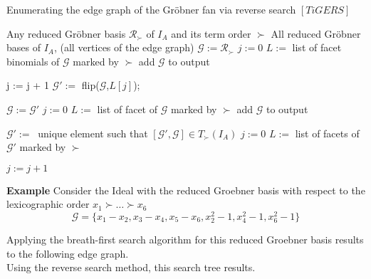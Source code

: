 \begin{algorithm}
\caption{Enumerating the edge graph of the Gröbner fan via reverse search $\left[ TiGERS\right]  $}
\label{reverse-alg}
\begin{algorithmic}[1]

\Require
Any reduced Gröbner basis $ \mathcal{R}_{\succ} $ of $I_A$ and its term order $\succ$
\Ensure All reduced Gröbner bases of $I_A$, (all vertices of the edge graph)
\State $\mathcal{G} := \mathcal{R}_{\succ} $
\State $j := 0$
\State $L := $ list of facet binomials of $\mathcal{G}$ marked by $\succ$
\State add $\mathcal{G}$ to output
\Repeat
{}

\State j := j + 1
\State $\mathcal{G}':= $ flip($\mathcal{G}$,$L[j]$);

\State $\mathcal{G} := \mathcal{G}' $  
\State $ j := 0$
\State $ L := $ list of facet of $\mathcal{G}$ marked by $\succ$
\State add $ \mathcal{G}$ to output

\EndIf 

\EndWhile

\State $\mathcal{G}' :=~$ unique element such that $[\mathcal{G}',\mathcal{G}] \in T_{\succ}(I_{A}) $
\State $j := 0$
\State $L := $ list of facets of $\mathcal{G}'$ marked by $\succ$

\Repeat
\State $j := j + 1$

\EndIf



\end{algorithmic}
\end{algorithm}

\textbf{Example}
Consider the Ideal with the reduced Groebner basis with respect to the lexicographic order $x_{1} \succ \ldots \succ x_{6} $
\[ \mathcal{G} = \{x_{1} - x_{2}, x_{3} - x_{4}, x_{5}-x_{6} , x_{2}^{2} -1 , x_{4}^{2} - 1, x_{6}^{2} - 1 \} \]

Applying the breath-first search algorithm for this reduced Groebner basis results to the following edge graph.\\


Using the reverse search method, this search tree results.

